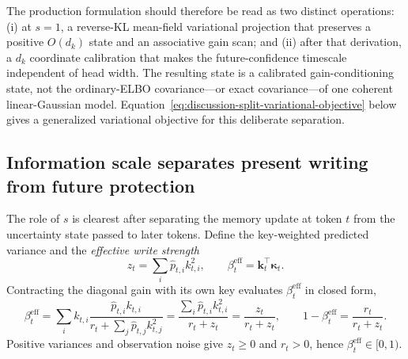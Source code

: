 \documentclass[11pt]{article}
\newcommand{\vct}[1]{\boldsymbol{#1}}
\begin{document}
The production formulation should therefore be read as two distinct operations: (i) at $s=1$,
a reverse-KL mean-field variational projection that preserves a positive $O(d_k)$ state and an
associative gain scan; and (ii) after that derivation, a $d_k$ coordinate calibration that makes
the future-confidence timescale independent of head width. The resulting state is a calibrated
gain-conditioning state, not the ordinary-ELBO covariance---or exact covariance---of one coherent
linear-Gaussian model. Equation~\eqref{eq:discussion-split-variational-objective} below gives a
generalized variational objective for this deliberate separation.

\subsection{Information scale separates present writing from future protection}
\label{subsec:discussion-info-scale-temporal}

The role of $s$ is clearest after separating the memory update at token $t$ from the uncertainty
state passed to later tokens. Define the key-weighted predicted variance and the
\emph{effective write strength}
\begin{equation}
  z_t=\sum_i\widehat p_{t,i}k_{t,i}^2,
  \qquad
  \beta_t^{\mathrm{eff}}
  =\vct{k}_t^\top\vct{\kappa}_t.
  \label{eq:discussion-effective-write}
\end{equation}
Contracting the diagonal gain with its own key evaluates $\beta_t^{\mathrm{eff}}$ in closed form,
\begin{equation}
  \beta_t^{\mathrm{eff}}
  =\sum_i k_{t,i}
    \frac{\widehat p_{t,i}k_{t,i}}
      {r_t+\sum_j\widehat p_{t,j}k_{t,j}^2}
  =\frac{\sum_i\widehat p_{t,i}k_{t,i}^2}{r_t+z_t}
  =\frac{z_t}{r_t+z_t},
  \qquad
  1-\beta_t^{\mathrm{eff}}=\frac{r_t}{r_t+z_t}.
  \label{eq:discussion-effective-write-closed}
\end{equation}
Positive variances and observation noise give $z_t\geq0$ and $r_t>0$, hence
$\beta_t^{\mathrm{eff}}\in[0,1)$.
\end{document}
